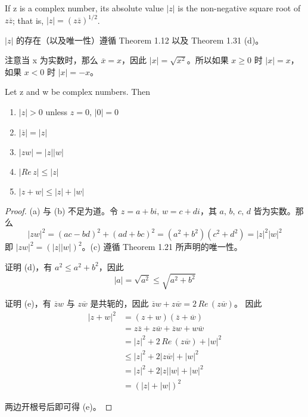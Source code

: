\documentclass[../poma-note.tex]{subfiles}
\begin{document}
\begin{definition}
	If z is a complex number, its absolute value $|z|$ is the non-negative square root of $z\overline{z}$; that is,
	$|z| = (z\overline{z})^{1/2}$.
\end{definition}

$|z|$ 的存在（以及唯一性）遵循 Theorem 1.12 以及 Theorem 1.31 (d)。

注意当 x 为实数时，那么 $\overline{x} = x$，因此 $|x| = \sqrt{x^2}$。所以如果 $x \ge 0$ 时 $|x| = x$，如果 $x<0$ 时 $|x| = -x$。

\begin{theorem}
	Let z and w be complex numbers. Then
	\begin{enumerate}[label=(\alph*)]
		\item $|z|>0$ unless $z=0,\,|0|=0$
		\item $|\overline{z}|=|z|$
		\item $|zw|=|z||w|$
		\item $|Re \, z| \le |z|$
		\item $|z+w| \le |z|+|w|$
	\end{enumerate}
\end{theorem}

\begin{proof}
	(a) 与 (b) 不足为道。令 $z=a+bi,\,w=c+di$，其 $a,\,b,\,c,\,d$ 皆为实数。那么
	\[|zw|^2 = (ac-bd)^2 + (ad+bc)^2 = (a^2+b^2)(c^2+d^2) = |z|^2|w|^2\]
	即 $|zw|^2 = (|z||w|)^2$。(c) 遵循 Theorem 1.21 所声明的唯一性。

	证明 (d)，有 $a^2 \le a^2 + b^2$，因此
	\[|a| = \sqrt{a^2} \le \sqrt{a^2 + b^2}\]

	证明 (e)，有 $\overline{z}w$ 与 $z\overline{w}$ 是共轭的，因此 $\overline{z}w + z\overline{w} = 2\, Re\,(z\overline{w})$。
	因此
	\begin{align*}
		\mathcal |z+w|^2 & = (z+w)(\overline{z}+\overline{w})                              \\
		                 & = z\overline{z} + z\overline{w} + \overline{z}w + w\overline{w} \\
		                 & = |z|^2 + 2\,Re\,(z\overline{w}) + |w|^2                        \\
		                 & \le |z|^2 + 2|z\overline{w}| + |w|^2                            \\
		                 & = |z|^2 + 2|z||w| + |w|^2                                       \\
		                 & = (|z|+|w|)^2
	\end{align*}

	两边开根号后即可得 (e)。
\end{proof}
\end{document}
